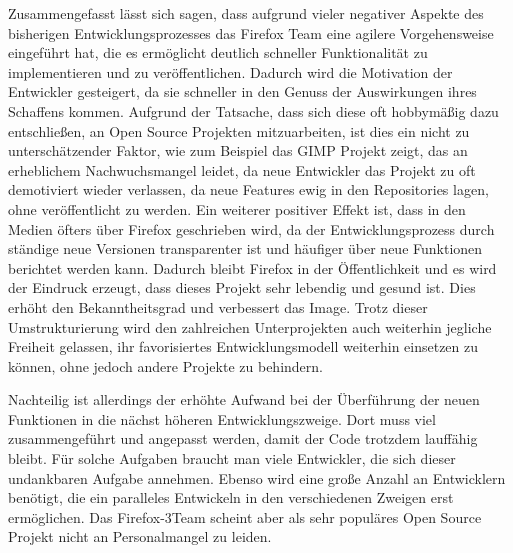 Zusammengefasst lässt sich sagen, dass aufgrund vieler negativer Aspekte des bisherigen Entwicklungsprozesses das Firefox Team eine agilere Vorgehensweise eingeführt hat, die es ermöglicht deutlich schneller Funktionalität zu implementieren und zu veröffentlichen. Dadurch wird die Motivation der Entwickler gesteigert, da sie schneller in den Genuss der Auswirkungen ihres Schaffens kommen. Aufgrund der Tatsache, dass sich diese oft hobbymäßig dazu entschließen, an Open Source Projekten mitzuarbeiten, ist dies ein nicht zu unterschätzender Faktor, wie zum Beispiel das GIMP Projekt zeigt, das an erheblichem Nachwuchsmangel leidet, da neue Entwickler das Projekt zu oft demotiviert wieder verlassen,  da neue Features ewig in den Repositories lagen, ohne veröffentlicht zu werden\cite{bib:gimp}. Ein weiterer positiver Effekt ist, dass in den Medien öfters über Firefox geschrieben wird, da der Entwicklungsprozess durch ständige neue Versionen transparenter ist und häufiger über neue Funktionen berichtet werden kann. Dadurch bleibt Firefox in der Öffentlichkeit und es  wird der Eindruck erzeugt, dass dieses Projekt sehr lebendig und gesund ist. Dies erhöht den Bekanntheitsgrad und verbessert das Image. Trotz dieser Umstrukturierung wird den zahlreichen Unterprojekten auch weiterhin jegliche Freiheit gelassen, ihr favorisiertes Entwicklungsmodell weiterhin einsetzen zu können, ohne jedoch andere Projekte zu behindern.

Nachteilig ist allerdings der erhöhte Aufwand bei der Überführung der neuen Funktionen in die nächst höheren Entwicklungszweige. Dort muss viel zusammengeführt und angepasst werden, damit der Code trotzdem lauffähig bleibt. Für solche Aufgaben braucht man viele Entwickler, die sich dieser undankbaren Aufgabe annehmen. Ebenso wird eine große Anzahl an Entwicklern benötigt, die ein paralleles Entwickeln in den verschiedenen Zweigen erst ermöglichen. Das Firefox-3Team scheint aber als sehr populäres Open Source Projekt nicht an Personalmangel zu leiden.

